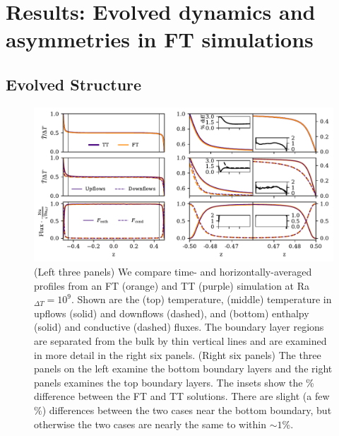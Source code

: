 \documentclass[aps, pre, onecolumn, nofootinbib, notitlepage, groupedaddress, amsfonts, amssymb, amsmath, longbibliography, superscriptaddress]{revtex4-1}
\begin{document}
\FloatBarrier



\section{Results: Evolved dynamics and asymmetries in FT simulations}
\label{sec:results_dynamics}

\subsection{Evolved Structure}
\begin{figure}
\includegraphics[width=\textwidth]{./figs/rbc_1D_profiles.pdf}
\caption{ 
	(Left three panels) We compare time- and horizontally-averaged profiles from an FT (orange) and TT (purple) simulation at Ra$_{\Delta T} = 10^{9}$.
	Shown are the (top) temperature, (middle) temperature in upflows (solid) and downflows (dashed), and (bottom) enthalpy (solid) and conductive (dashed) fluxes.
	The boundary layer regions are separated from the bulk by thin vertical lines and are examined in more detail in the right six panels.
	(Right six panels) The three panels on the left examine the bottom boundary layers and the right panels examines the top boundary layers.
	The insets show the \% difference between the FT and TT solutions.
	There are slight (a few \%) differences between the two cases near the bottom boundary, but otherwise the two cases are nearly the same to within $\sim 1$\%.
\label{fig:rbc_1D_profiles} }
\vspace{0.5cm}
\end{figure}
\end{document}
